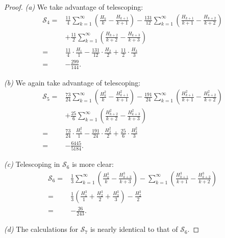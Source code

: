 \documentclass[10pt,a4paper]{amsart}
\begin{document}
\begin{proof}
    \textit{(a)} We take advantage of telescoping:
    \begin{align*}
        \mathcal{S}_4
        =& \frac{11}{4}\sum_{k=1}^\infty \left(\frac{H_k}{k} - \frac{H_{k+1}}{k+1}\right) - \frac{131}{12}\sum_{k=1}^\infty \left( \frac{H_{k+1}}{k+1} -  \frac{H_{k+2}}{k+2}\right) \\
        &+ \frac{11}{2}\sum_{k=1}^\infty \left(\frac{H_{k+2}}{k+2} - \frac{H_{k+3}}{k+3}\right)\\
        =& \frac{11}{4} \cdot \frac{H_1}{1} - \frac{131}{12} \cdot \frac{H_2}{2} + \frac{11}{2} \cdot \frac{H_3}{3}\\
        =& -\frac{299}{144}.
    \end{align*}

    \noindent
    \textit{(b)} We again take advantage of telescoping:
    \begin{align*}
        \mathcal{S}_5
        =& \frac{73}{24}\sum_{k=1}^\infty \left(\frac{H_k^2}{k} - \frac{H_{k+1}^2}{k+1}\right) - \frac{191}{24}\sum_{k=1}^\infty \left(\frac{H_{k+1}^2}{k+1} - \frac{H_{k+2}^2}{k+2}\right) \\
        &+ \frac{25}{6}\sum_{k=1}^\infty \left(\frac{H_{k+2}^2}{k+2} - \frac{H_{k+3}^2}{k+3}\right)\\
        =& \frac{73}{24} \cdot \frac{H_1^2}{1} - \frac{191}{24} \cdot \frac{H_2^2}{2} + \frac{25}{6} \cdot \frac{H_3^2}{3}\\
        =& -\frac{6445}{5184}.
    \end{align*}

    \noindent
    \textit{(c)} Telescoping in $\mathcal{S}_6$ is more clear:
    \begin{align*}
        \mathcal{S}_6
        =& \frac{1}{3}\sum_{k=1}^\infty \left(\frac{H_k^3}{k} - \frac{H_{k+3}^3}{k+3}\right) - \sum_{k=1}^\infty \left(\frac{H_{k+1}^3}{k+1} - \frac{H_{k+2}^3}{k+2}\right)\\
        =& \frac{1}{3}\left(\frac{H_1^3}{1}+\frac{H_2^3}{2}+\frac{H_3^3}{3}\right) - \frac{H_2^3}{2}\\
        =& -\frac{26}{243}.
    \end{align*}

    \noindent
    \textit{(d)} The calculations for $\mathcal{S}_7$ is nearly identical to that of $\mathcal{S}_6$.
\end{proof}
\end{document}

